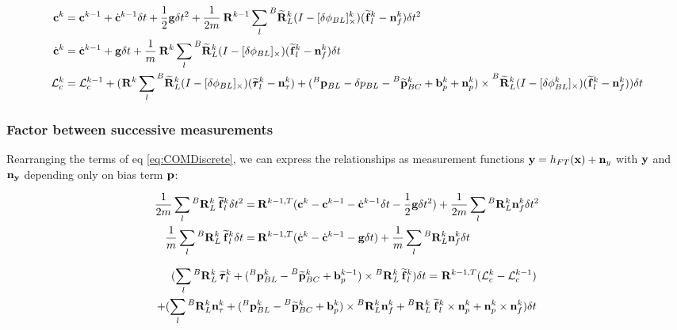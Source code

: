 \documentclass[11pt]{article}
\newcommand{\Rot}[2]{\prescript{#1}{}{\bfR}_{#2}}
\newcommand{\Rotm}[2]{\prescript{#1}{}{\widetilde{\bfR}}_{#2}}
\newcommand{\noise}{\bfn}
\newcommand{\bias}{\bfb}
\newcommand{\posi}[2]{\prescript{#1}{}{\bfp}_{#2}}
\newcommand{\posim}[2]{\prescript{#1}{}{\widetilde{\bfp}}_{#2}}
\newcommand{\forcem}[2]{\prescript{#1}{}{\widetilde{\bff}}_{#2}}
\newcommand{\torquem}[2]{\prescript{#1}{}{\widetilde{\pmb{\tau}}}_{#2}}
\newcommand{\AM}{\mathcal{L}}
\newcommand{\COM}{\bfc}
\newcommand{\COMd}{\dot{\bfc}}
\begin{document}
\begin{small}
\begin{equation}
\begin{split}
\COM^{k} &= \COM^{k-1} + \COMd^{k-1} \delta t 
+ \frac{1}{2} \bfg \delta t^2 + \frac{1}{2m} \Rot{}{}^{k-1} \sum_l \Rotm{B}{L}^k (I - [\delta \phi_{BL}]_{\times}^{k}) (\forcem{}{l}^{k} - \noise_f^{k}) \delta t^2
\\
\COMd^{k}&= \COMd^{k-1} + \bfg \delta t + \frac{1}{m} \Rot{}{}^{k} \sum_l \Rotm{B}{L}^k (I - [\delta \phi_{BL}]_{\times}) (\forcem{}{l}^{k} - \noise_f^{k}) \delta t 
\\
\AM_c^{k} &= \AM_c^{k-1} +  ( 
\Rot{}{}^{k}\sum_l \Rotm{B}{L}^k (I - [\delta \phi_{BL}]_{\times}) (\torquem{}{l}^{k} - \noise_{\tau}^{k}) + (\posi{B}{BL} - \delta p_{BL} - \posim{B}{BC}^{k} + \bias_{p}^{k} + \noise_p^{k}) \times \Rotm{B}{L}^k (I - [\delta \phi_{BL}^k]_{\times}) (\forcem{}{l}^{k} - \noise_f^{k}) 
) \delta t
\end{split}
\label{eq:COMDiscrete}
\end{equation}
\end{small}


\subsubsection{Factor between successive measurements}
Rearranging the terms of eq \ref{eq:COMDiscrete}, we can express the relationships as measurement functions $\bfy = h_{FT}(\bfx) + \noise_y$ with ${\bf y}$ and $\noise_{\bfy}$ depending only on bias term ${\bf p}$:

\begin{small}
\begin{equation}
\begin{split}
	\frac{1}{2m}\sum_l \Rot{B}{L}^{k} \forcem{}{l}^{k}\delta t^2 =& 
	\Rot{}{}^{k-1,T}(\COM^{k} - \COM^{k-1} - \COMd^{k-1} \delta t - \frac{1}{2} \bfg \delta t^2)
	+ \frac{1}{2m}\sum_l \Rot{B}{L}^{k} \noise_f^{k}\delta t^2
	\\
	\frac{1}{m} \sum_l \Rot{B}{L}^{k} \forcem{}{l}^{k} \delta t =& \Rot{}{}^{k-1,T}(\COMd^{k} - \COMd^{k-1} - \bfg \delta t) 
	+ \frac{1}{m} \sum_l \Rot{B}{L}^{k} \noise_f^{k} \delta t	
\end{split}
\label{eq:CCdFactor}
\end{equation}
\end{small}

\begin{small}
\begin{equation}
\begin{split}
	(\sum_l \Rot{B}{L}^{k}\torquem{}{l}^{k} + (\posi{B}{BL}^{k} - \posim{B}{BC}^{k} + \bias_{p}^{k-1}) \times \Rot{B}{L}^{k}\forcem{}{l}^{k}) \delta t = 
	\Rot{}{}^{k-1,T}(\AM_c^{k} - \AM_c^{k-1})
	\\
	+ (\sum_l \Rot{B}{L}^{k}\noise_{\tau}^{k} + (\posi{B}{BL}^{k} - \posim{B}{BC}^{k} + \bias_{p}^{k})\times \Rot{B}{L}^{k}\noise_f^{k}  + \Rot{B}{L}^{k}\forcem{}{l}^{k}  \times \noise_p^{k} + \noise^k_p \times \noise^k_f)\delta t
\end{split}
\label{eq:LcFactor}
\end{equation}
\end{small}
\end{document}
